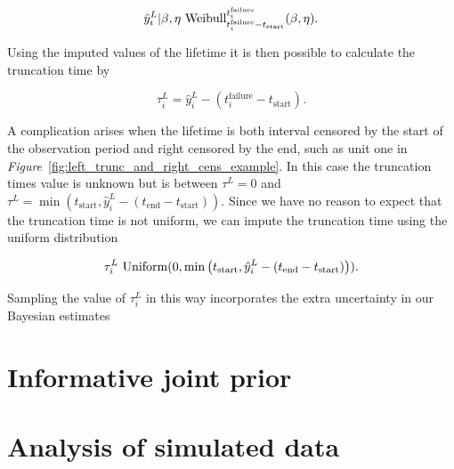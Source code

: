 \begin{equation}
    \hat{y}^L_i|\beta, \eta ~ \hbox{Weibull}^{t^{\text{failure}}_{i}}_{t^{\text{failure}}_{i} - t_\text{start}}(\beta, \eta).
\end{equation}

\noindent Using the imputed values of the lifetime it is then possible to calculate the truncation time by

\begin{equation}
    \tau^L_i = \hat{y}^L_i - \left(t^{\text{failure}}_{i} - t_\text{start}\right).
\end{equation}

A complication arises when the lifetime is both interval censored by the start of the observation period and right censored by the end, such as unit one in \textit{Figure}~\ref{fig:left_trunc_and_right_cens_example}. In this case the truncation times value is unknown but is between $\tau^L = 0$ and $\tau^L = \min\left(t_\text{start}, \hat{y}^L_i - (t_\text{end} - t_\text{start})\right)$. Since we have no reason to expect that the truncation time is not uniform, we can impute the truncation time using the uniform distribution

\begin{equation}
    \tau^L_i ~ \hbox{Uniform}(0, \min\left(t_\text{start}, \hat{y}^L_i - (t_\text{end} - t_\text{start})\right)).
\end{equation}

\noindent Sampling the value of $\tau^L_i$ in this way incorporates the extra uncertainty in our Bayesian estimates

\section{Informative joint prior}

\section{Analysis of simulated data}

